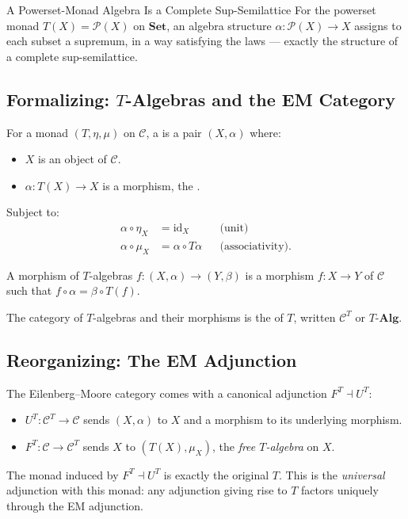 \begin{example}{A Powerset-Monad Algebra Is a Complete Sup-Semilattice}
For the powerset monad $T(X) = \mathcal{P}(X)$ on $\mathbf{Set}$, an
algebra structure $\alpha : \mathcal{P}(X) \to X$ assigns to each subset
a supremum, in a way satisfying the laws --- exactly the structure of a
complete sup-semilattice.
\end{example}

\subsection{Formalizing: $T$-Algebras and the EM Category}

For a monad $(T, \eta, \mu)$ on $\mathcal{C}$, a  is a
pair $(X, \alpha)$ where:
\begin{itemize}
  \item $X$ is an object of $\mathcal{C}$.
  \item $\alpha : T(X) \to X$ is a morphism, the .
\end{itemize}
Subject to:
\begin{align*}
  \alpha \circ \eta_X &= \mathrm{id}_X
    && \text{(unit)} \\
  \alpha \circ \mu_X &= \alpha \circ T \alpha
    && \text{(associativity).}
\end{align*}

A morphism of $T$-algebras $f : (X, \alpha) \to (Y, \beta)$ is a morphism
$f : X \to Y$ of $\mathcal{C}$ such that $f \circ \alpha = \beta \circ T(f)$.

The category of $T$-algebras and their morphisms is the
 of $T$, written $\mathcal{C}^T$ or
$T\text{-}\mathbf{Alg}$.

\subsection{Reorganizing: The EM Adjunction}

The Eilenberg--Moore category comes with a canonical adjunction
$F^T \dashv U^T$:
\begin{itemize}
  \item $U^T : \mathcal{C}^T \to \mathcal{C}$ sends $(X, \alpha)$ to $X$
        and a morphism to its underlying morphism.
  \item $F^T : \mathcal{C} \to \mathcal{C}^T$ sends $X$ to
        $(T(X), \mu_X)$, the \emph{free $T$-algebra} on $X$.
\end{itemize}
The monad induced by $F^T \dashv U^T$ is exactly the original $T$. This
is the \emph{universal} adjunction with this monad: any adjunction giving
rise to $T$ factors uniquely through the EM adjunction.

